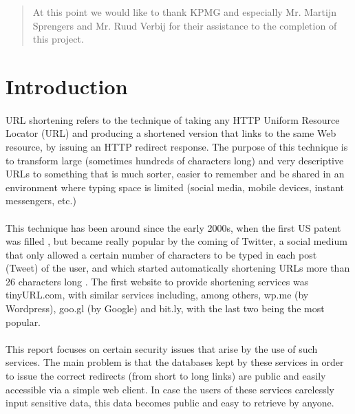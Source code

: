 \documentclass[12pt]{article}
\begin{document}
\renewcommand{\abstractname}{Acknowledgements}
\begin{abstract}
At this point we would like to thank KPMG and especially Mr. Martijn Sprengers and Mr. Ruud Verbij for their assistance to the completion of this project.
\end{abstract}

\newpage

%
\section{Introduction}

%
\paragraph{}
URL shortening refers to the technique of taking any HTTP Uniform Resource Locator (URL) and producing a shortened version that links to the same Web resource, by issuing an HTTP redirect response. The purpose of this technique is to transform large (sometimes hundreds of characters long) and very descriptive URLs to something that is much sorter, easier to remember and be shared in an environment where typing space is limited (social media, mobile devices, instant messengers, etc.)
\paragraph{}
This technique has been around since the early 2000s, when the first US patent was filled \cite{uspatent}, but became really popular by the coming of Twitter, a social medium that only allowed a certain number of characters to be typed in each post (Tweet) of the user, and which started automatically shortening URLs more than 26 characters long \cite{twitter}. The first website to provide shortening services was tinyURL.com, with similar services including, among others, wp.me (by Wordpress), goo.gl (by Google) and bit.ly, with the last two being the most popular. 
\paragraph{}
This report focuses on certain security issues that arise by the use of such services. The main problem is that the databases kept by these services in order to issue the correct redirects (from short to long links) are public and easily accessible via a simple web client. In case the users of these services carelessly input sensitive data, this data becomes public and easy to retrieve by anyone.
\end{document}

